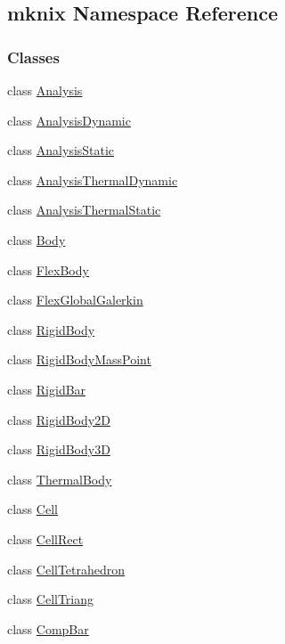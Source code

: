 \hypertarget{namespacemknix}{\subsection{mknix Namespace Reference}
\label{namespacemknix}
}
\subsubsection*{Classes}
\begin{DoxyCompactItemize}
\item 
class \hyperlink{classmknix_1_1_analysis}{Analysis}
\item 
class \hyperlink{classmknix_1_1_analysis_dynamic}{Analysis\-Dynamic}
\item 
class \hyperlink{classmknix_1_1_analysis_static}{Analysis\-Static}
\item 
class \hyperlink{classmknix_1_1_analysis_thermal_dynamic}{Analysis\-Thermal\-Dynamic}
\item 
class \hyperlink{classmknix_1_1_analysis_thermal_static}{Analysis\-Thermal\-Static}
\item 
class \hyperlink{classmknix_1_1_body}{Body}
\item 
class \hyperlink{classmknix_1_1_flex_body}{Flex\-Body}
\item 
class \hyperlink{classmknix_1_1_flex_global_galerkin}{Flex\-Global\-Galerkin}
\item 
class \hyperlink{classmknix_1_1_rigid_body}{Rigid\-Body}
\item 
class \hyperlink{classmknix_1_1_rigid_body_mass_point}{Rigid\-Body\-Mass\-Point}
\item 
class \hyperlink{classmknix_1_1_rigid_bar}{Rigid\-Bar}
\item 
class \hyperlink{classmknix_1_1_rigid_body2_d}{Rigid\-Body2\-D}
\item 
class \hyperlink{classmknix_1_1_rigid_body3_d}{Rigid\-Body3\-D}
\item 
class \hyperlink{classmknix_1_1_thermal_body}{Thermal\-Body}
\item 
class \hyperlink{classmknix_1_1_cell}{Cell}
\item 
class \hyperlink{classmknix_1_1_cell_rect}{Cell\-Rect}
\item 
class \hyperlink{classmknix_1_1_cell_tetrahedron}{Cell\-Tetrahedron}
\item 
class \hyperlink{classmknix_1_1_cell_triang}{Cell\-Triang}
\item 
class \hyperlink{classmknix_1_1_comp_bar}{Comp\-Bar}

\end{DoxyCompactItemize}
